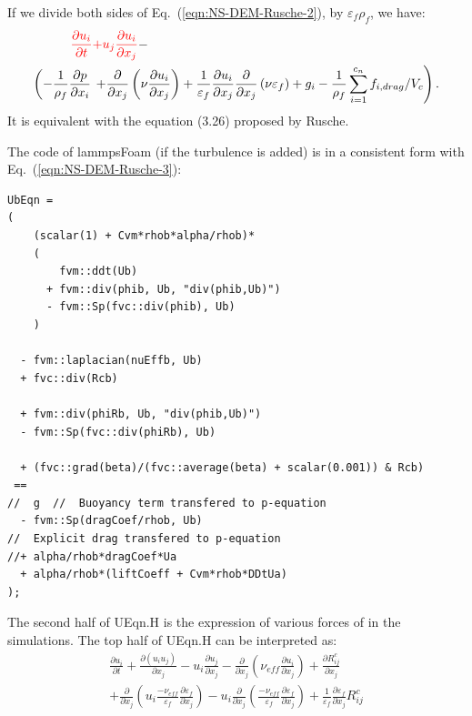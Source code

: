 \documentclass[11pt]{article}
\begin{document}
If we divide both sides of Eq.~(\ref{eqn:NS-DEM-Rusche-2}), by $\varepsilon_f \rho_f$, we have:
\begin{equation}
    \begin{split}
    {\color{red}\frac{\partial u_i}{\partial t}}
    &{\color{red}+ u_j \frac{\partial u_i}{\partial x_j}} - \\
     \left(- \frac{1}{\rho_f}\frac{\partial p}{\partial x_i}\right.
    &\left.+ \frac{\partial}{\partial x_j}\left(\nu \frac{\partial u_i}{\partial x_j}\right)
     + \frac{1}{\varepsilon_f}\frac{\partial u_i}{\partial x_j}
       \frac{\partial}{\partial x_j}\left(\nu \varepsilon_f \right)
     + g_i
     - \frac{1}{\rho_f}\sum\limits_{i=1}^{c_n}f_{i,drag}/V_c\right) .
    \end{split}
\label{eqn:NS-DEM-Rusche-3}
\end{equation}
It is equivalent with the equation (3.26) proposed by Rusche.

The code of lammpsFoam (if the turbulence is added) is in a consistent form with
Eq.~(\ref{eqn:NS-DEM-Rusche-3}):
\begin{lstlisting}[basicstyle=\ttfamily\scriptsize]
UbEqn =
(
    (scalar(1) + Cvm*rhob*alpha/rhob)*
    (
        fvm::ddt(Ub)
      + fvm::div(phib, Ub, "div(phib,Ub)")
      - fvm::Sp(fvc::div(phib), Ub)
    )

  - fvm::laplacian(nuEffb, Ub)
  + fvc::div(Rcb)

  + fvm::div(phiRb, Ub, "div(phib,Ub)")
  - fvm::Sp(fvc::div(phiRb), Ub)

  + (fvc::grad(beta)/(fvc::average(beta) + scalar(0.001)) & Rcb)
 ==
//  g  //  Buoyancy term transfered to p-equation
  - fvm::Sp(dragCoef/rhob, Ub)
//  Explicit drag transfered to p-equation
//+ alpha/rhob*dragCoef*Ua 
  + alpha/rhob*(liftCoeff + Cvm*rhob*DDtUa)
);
\end{lstlisting}

The second half of UEqn.H is the expression of various forces of in the simulations. The top half
of UEqn.H can be interpreted as:
\begin{equation}
    \begin{split}
      \frac{\partial u_i}{\partial t}
      + \frac{\partial (u_i u_j)}{\partial x_j}
      - u_i \frac{\partial u_j}{\partial x_j}
      - \frac{\partial}{\partial x_j}\left(\nu_{eff} \frac{\partial u_i}{\partial x_j}\right)
      + \frac{\partial R^c_{ij}}{\partial x_j}\\ 
      + \frac{\partial}{\partial x_j}\left(u_i\frac{-\nu_{eff}}{\varepsilon_f}
        \frac{\partial \varepsilon_f}{\partial x_j}\right)
      - u_i \frac{\partial}{\partial x_j}\left(\frac{-\nu_{eff}}{\varepsilon_f}
        \frac{\partial \varepsilon_f}{\partial x_j}\right)
        + \frac{1}{\varepsilon_f}\frac{\partial \varepsilon_f}{\partial x_j}R^c_{ij}
    \end{split}
\label{eqn:lammpsFoam-1}
\end{equation}
\end{document}
